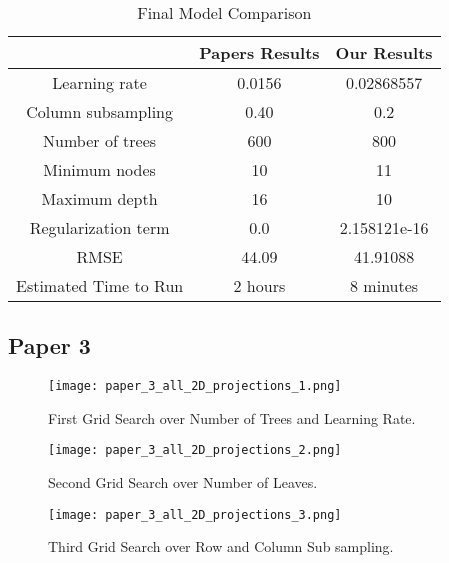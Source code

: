 \documentclass[12pt]{article}
\begin{document}
\begin{table}[!h]
 \centering
 \begin{tabular}{ | c | c | c |} 

 \hline
 & Papers Results & Our Results \\
 \hline
 Learning rate & 0.0156 &0.02868557 \\
 Column subsampling & 0.40 & 0.2 \\
 Number of trees & 600 & 800 \\
 Minimum nodes & 10 & 11 \\
 Maximum depth & 16 & 10\\
Regularization term & 0.0 & 2.158121e-16 \\
RMSE & 44.09 & 41.91088 \\
Estimated Time to Run &  2 hours & 8 minutes \\

 \hline 
 \end{tabular}
 \caption{ Final Model Comparison }
 \end{table}

\newpage 
\subsection{Paper 3}



  \begin{figure}[!hbtp]
\centering
\texttt{[image: paper\_3\_all\_2D\_projections\_1.png]}
\caption{First Grid Search over Number of Trees and Learning Rate.}
\end{figure}

\newpage

  \begin{figure}[!hbtp]
\centering
\texttt{[image: paper\_3\_all\_2D\_projections\_2.png]}
\caption{Second Grid Search over Number of Leaves.}
\end{figure}

\newpage

  \begin{figure}[!hbtp]
\centering
\texttt{[image: paper\_3\_all\_2D\_projections\_3.png]}
\caption{Third Grid Search over Row and Column Sub sampling.}
\end{figure}

\vspace*{1.5cm}
\end{document}
